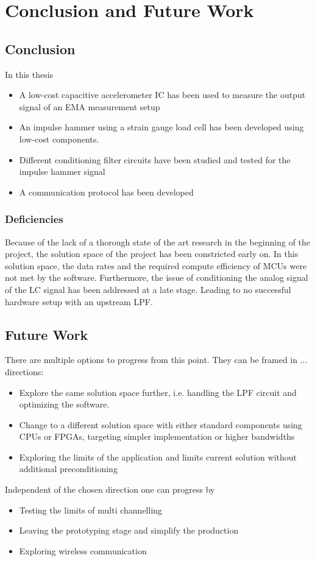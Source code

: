 \chapter{Conclusion and Future Work}

\section{Conclusion}
In this thesis
\begin{itemize}
    \item A low-cost capacitive accelerometer \ac{IC} has been used to measure the output signal of an \ac{EMA} measurement setup
    \item An impulse hammer using a strain gauge load cell has been developed using low-cost components.
    \item Different conditioning filter circuits have been studied and tested for the impulse hammer signal
    \item A communication protocol has been developed
\end{itemize}

\subsection{Deficiencies}
Because of the lack of a thorough state of the art research in the beginning of the project, the solution space of the project has been constricted early on. In this solution space, the data rates and the required compute efficiency of \ac{MCU}s were not met by the software. Furthermore, the issue of conditioning the analog signal of the \ac{LC} signal has been addressed at a late stage. Leading to no successful hardware setup with an upstream \ac{LPF}. 

\newpage
\section{Future Work}
There are multiple options to progress from this point. They can be framed in ... directions:
\begin{itemize}
    \item Explore the same solution space further, i.e. handling the \ac{LPF} circuit and optimizing the software.
    \item Change to a different solution space with either standard components using \ac{CPU}s or \ac{FPGA}s, targeting simpler implementation or higher bandwidths
    \item Exploring the limits of the application and limits current solution without additional preconditioning
\end{itemize}

Independent of the chosen direction one can progress by
\begin{itemize}
    \item Testing the limits of multi channelling
    \item Leaving the prototyping stage and simplify the production
    \item Exploring wireless communication
\end{itemize}